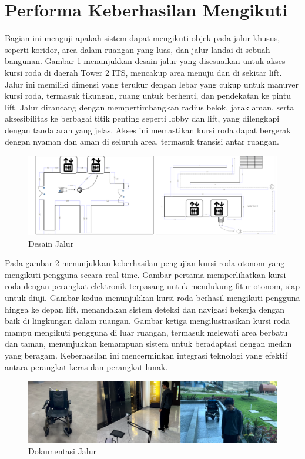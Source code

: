 \section{Performa Keberhasilan Mengikuti}
\label{sec:performamengikuti}

Bagian ini menguji apakah sistem dapat mengikuti objek pada jalur khusus, seperti koridor, area dalam ruangan yang luas, dan jalur landai di sebuah bangunan. Gambar \ref{fig:rute} menunjukkan desain jalur yang disesuaikan untuk akses kursi roda di daerah Tower 2 ITS, mencakup area menuju dan di sekitar lift. Jalur ini memiliki dimensi yang terukur dengan lebar yang cukup untuk manuver kursi roda, termasuk tikungan, ruang untuk berhenti, dan pendekatan ke pintu lift. Jalur dirancang dengan mempertimbangkan radius belok, jarak aman, serta aksesibilitas ke berbagai titik penting seperti lobby dan lift, yang dilengkapi dengan tanda arah yang jelas. Akses ini memastikan kursi roda dapat bergerak dengan nyaman dan aman di seluruh area, termasuk transisi antar ruangan.

\begin{figure}[H]
    \centering
    \includegraphics[width=1\textwidth]{gambar/rute.png}
    \caption{Desain Jalur}
    \label{fig:rute}
\end{figure}

Pada gambar \ref{fig:doc_jalur} menunjukkan keberhasilan pengujian kursi roda otonom yang mengikuti pengguna secara real-time. Gambar pertama memperlihatkan kursi roda dengan perangkat elektronik terpasang untuk mendukung fitur otonom, siap untuk diuji. Gambar kedua menunjukkan kursi roda berhasil mengikuti pengguna hingga ke depan lift, menandakan sistem deteksi dan navigasi bekerja dengan baik di lingkungan dalam ruangan. Gambar ketiga mengilustrasikan kursi roda mampu mengikuti pengguna di luar ruangan, termasuk melewati area berbatu dan taman, menunjukkan kemampuan sistem untuk beradaptasi dengan medan yang beragam. Keberhasilan ini mencerminkan integrasi teknologi yang efektif antara perangkat keras dan perangkat lunak.

\begin{figure}[H]
    \centering
    \includegraphics[width=1\textwidth]{gambar/sc_all.png}
    \caption{Dokumentasi Jalur}
    \label{fig:doc_jalur}   
\end{figure}



